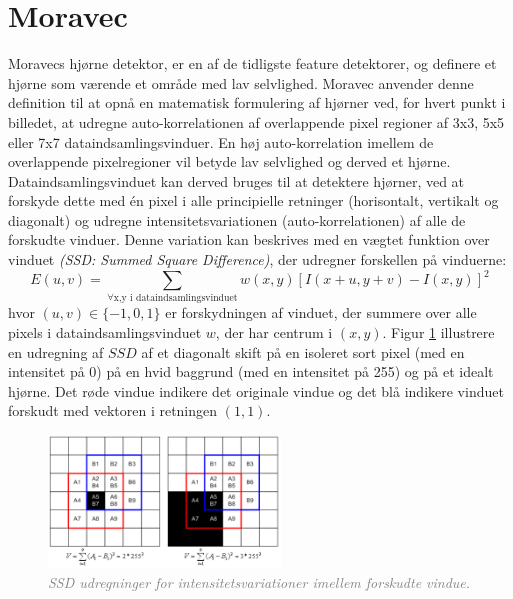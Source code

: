 \section{Moravec}\label{sec:moravec}
Moravecs hjørne detektor\cite{moravec}, er en af de tidligste feature detektorer, og definere et hjørne som værende et område med lav selvlighed. Moravec anvender denne definition til at opnå en matematisk formulering af hjørner ved, for hvert punkt i billedet, at udregne auto-korrelationen af overlappende pixel regioner af 3x3, 5x5 eller 7x7 dataindsamlingsvinduer. En høj auto-korrelation imellem de overlappende pixelregioner vil betyde lav selvlighed og derved et hjørne. Dataindsamlingsvinduet kan derved bruges til at detektere hjørner, ved at forskyde dette med én pixel i alle principielle retninger (horisontalt, vertikalt og diagonalt) og udregne intensitetsvariationen (auto-korrelationen) af alle de forskudte vinduer. Denne variation kan beskrives med en vægtet funktion over vinduet  \emph{(SSD: Summed Square Difference)}, der udregner forskellen på vinduerne:
\begin{equation}
E(u,v)= \sum_{\forall \text{x,y i dataindsamlingsvinduet}} w(x,y)[I(x+u,y+v) - I(x,y)]^2
\label{moravec}     
\end{equation}
hvor $(u,v)\in \lbrace -1,0,1 \rbrace$ er forskydningen af vinduet, der summere over alle pixels i dataindsamlingsvinduet $w$, der har centrum i $(x,y)$. 
Figur \ref{fig:moravec} illustrere en udregning af $SSD$ af et diagonalt skift på en isoleret sort pixel (med en intensitet på 0) på en hvid baggrund (med en intensitet på 255) og på et idealt hjørne. Det røde vindue indikere det originale vindue og det blå indikere  vinduet forskudt med vektoren i retningen $(1,1)$. 
\begin{figure}[H]
    \centering
    \includegraphics[width=0.55\textwidth]{fig/25.png}
     \vspace{-1em}
    \begin{center}    
       \caption{\textcolor{gray}{\footnotesize \textit{ SSD udregninger for intensitetsvariationer imellem forskudte vindue. }}}
    \label{fig:moravec}
     \end{center}
     \vspace{-2.5em}
  \end{figure} \noindent   
